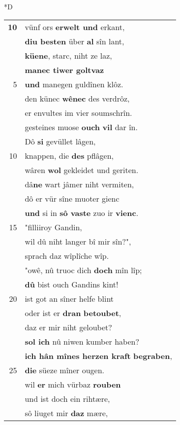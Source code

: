 \documentclass[8pt,a4paper,notitlepage]{article}
\begin{document}
\begin{table}[ht]
\begin{minipage}[t]{0.5\linewidth}
\small
\begin{center}*D
\end{center}
\begin{tabular}{rl}
\textbf{10} & vünf ors \textbf{erwelt und} erkant,\\ 
 & \textbf{diu besten} über \textbf{al} sîn lant,\\ 
 & \textbf{küene}, starc, niht ze laz,\\ 
 & \textbf{manec tiwer goltvaz}\\ 
5 & \textbf{und} manegen guldînen klôz.\\ 
 & den künec \textbf{wênec} des verdrôz,\\ 
 & er envultes im vier soumschrîn.\\ 
 & gesteines muose \textbf{ouch} \textbf{vil} dar în.\\ 
 & Dô \textbf{si} gevüllet lâgen,\\ 
10 & knappen, die \textbf{des} pflâgen,\\ 
 & wâren \textbf{wol} gekleidet und geriten.\\ 
 & dâ\textbf{ne} wart jâmer niht vermiten,\\ 
 & dô er vür sîne muoter gienc\\ 
 & \textbf{und} si in \textbf{sô vaste} zuo ir \textbf{vienc}.\\ 
15 & "filliiroy Gandin,\\ 
 & wil dû niht langer bî mir sîn?",\\ 
 & sprach daz wîplîche wîp.\\ 
 & "owê, nû truoc dich \textbf{doch} mîn lîp;\\ 
 & \textbf{dû} bist ouch Gandins kint!\\ 
20 & ist got an sîner helfe blint\\ 
 & oder ist er \textbf{dran} \textbf{betoubet},\\ 
 & daz er mir niht geloubet?\\ 
 & \textbf{sol ich} nû niwen kumber haben?\\ 
 & \textbf{ich hân mînes herzen kraft} \textbf{begraben},\\ 
25 & \textbf{die} süeze mîner ougen.\\ 
 & wil \textbf{er} mich vürbaz \textbf{rouben}\\ 
 & und ist doch ein rihtære,\\ 
 & sô liuget mir \textbf{daz} mære,\\ 

\end{tabular}
\end{minipage}
\end{table}
\end{document}

